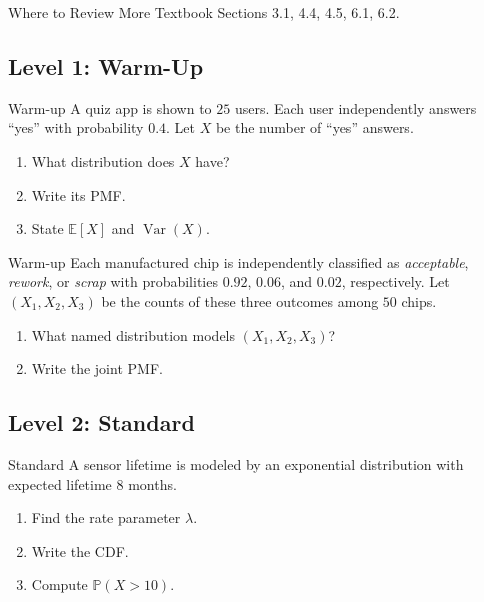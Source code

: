 \documentclass[12pt]{article}
\newcommand{\EE}{\mathbb{E}}
\newcommand{\PP}{\mathbb{P}}
\newcommand{\Var}{\operatorname{Var}}
\newcommand{\writespace}[1]{\vspace*{#1}}
\newcommand{\medws}{\writespace{1.8cm}}
\newcounter{problem}[section]
\begin{document}
\begin{reviewbox}{Where to Review More}
Textbook Sections 3.1, 4.4, 4.5, 6.1, 6.2.
\end{reviewbox}

\subsection*{Level 1: Warm-Up}

\begin{practiceproblem}{Warm-up}
A quiz app is shown to $25$ users. Each user independently answers ``yes'' with probability $0.4$. Let $X$ be the number of ``yes'' answers.
\begin{enumerate}
  \item What distribution does $X$ have?
  \item Write its PMF.
  \item State $\EE[X]$ and $\Var(X)$.
\end{enumerate}
\end{practiceproblem}
\medws

\begin{practiceproblem}{Warm-up}
Each manufactured chip is independently classified as \emph{acceptable}, \emph{rework}, or \emph{scrap} with probabilities $0.92$, $0.06$, and $0.02$, respectively. Let $(X_1,X_2,X_3)$ be the counts of these three outcomes among $50$ chips.
\begin{enumerate}
  \item What named distribution models $(X_1,X_2,X_3)$?
  \item Write the joint PMF.
\end{enumerate}
\end{practiceproblem}
\medws

\subsection*{Level 2: Standard}

\begin{practiceproblem}{Standard}
A sensor lifetime is modeled by an exponential distribution with expected lifetime $8$ months.
\begin{enumerate}
  \item Find the rate parameter $\lambda$.
  \item Write the CDF.
  \item Compute $\PP(X>10)$.
\end{enumerate}
\end{practiceproblem}
\medws
\end{document}
